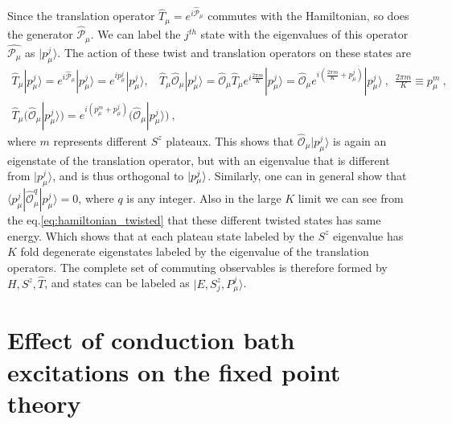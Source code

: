 \documentclass[reprint,onecolumn,prb,superscriptaddress]{revtex4-2}
\begin{document}
Since the translation operator $\hat{T}_{\mu}=e^{i\hat{\mathcal{P}}_{\mu}}$ commutes with the Hamiltonian, so does the generator $\hat{\mathcal{P}}_{\mu}$. We can label the $j^{th}$ state with the eigenvalues of this operator $\hat{\mathcal{P}_{\mu}}$ as $|p^{j}_{\mu}\rangle$. The action of these twist and translation operators on these states are
\begin{gather}
\hat{T}_{\mu} |p^j_{\mu} \rangle = e^{i\hat{\mathcal{P}}_{\mu}} |p^j_{\mu} \rangle = e^{ip^j_{\mu}} |p^j_{\mu}\rangle, ~ ~ ~ ~ \hat{T}_{\mu} \hat{\mathcal{O}}_{\mu} |p^j_{\mu} \rangle =  \hat{\mathcal{O}}_{\mu} \hat{T}_{\mu} e^{i\frac{2\pi m}{K}} |p^j_{\mu}\rangle = \hat{\mathcal{O}}_{\mu}   e^{i(\frac{2\pi m}{K}+p_{\mu}^j)} |p^j_{\mu}\rangle~,~~ \frac{2\pi m}{K} \equiv p_{\mu}^{m}~, \\
\hat{T}_{\mu} \bigg( \hat{\mathcal{O}}_{\mu} |p^j_{\mu} \rangle  \bigg) = e^{i(p_{\mu}^{m}+p_{\mu}^j)} \bigg( \hat{\mathcal{O}}_{\mu}    |p^j_{\mu}\rangle \bigg)~,
\end{gather}
where $m$ represents different $S^z$ plateaux. This shows that  $\hat{\mathcal{O}}_{\mu} |p^j_{\mu} \rangle $ is again an eigenstate of the translation operator, but with an eigenvalue that is different from $|p^j_{\mu} \rangle $, and is thus orthogonal to $\ket{p^j_{\mu}}$. Similarly, one can in general show that $\langle p^j_{\mu} | \hat{\mathcal{O}}^{q}_{\mu} |p^j_{\mu} \rangle=0$, where $q$ is any integer. Also in the large $K$ limit we can see from the eq.\eqref{eq:hamiltonian_twisted} that these different twisted states has same energy. Which shows that at each plateau state labeled by the $S^z$ eigenvalue has $K$ fold degenerate eigenstates labeled by the eigenvalue of the translation operators. The complete set of commuting observables is therefore formed by $H,S^z,\hat{T}$, and states can be labeled as  $|E,S^z_j,P^j_{\mu}\rangle$. 




\section{Effect of conduction bath excitations on the fixed point theory}
\end{document}
